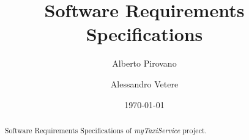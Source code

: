 \documentclass{article}      %
\title{Software Requirements Specifications}    %
\author{Alberto Pirovano \and Alessandro Vetere}      %
\date{\today}	%
\newcommand{\myTaxiService}[0]{\mbox{\emph{myTaxiService}}}
\newcommand{\sectionBaseDir}[1]{./section_#1} %
\newcommand{\sectionTexPath}[1]{\sectionBaseDir{#1}/section_#1.tex}
\newcommand{\inputSection}[1]{\newpage}}
\begin{document}
\maketitle
\begin{abstract} %
	Software Requirements Specifications of \myTaxiService{} project.
\end{abstract} %
\newpage %
\tableofcontents             %
\inputSection{1}
\inputSection{2}
\inputSection{3}
\end{document}
